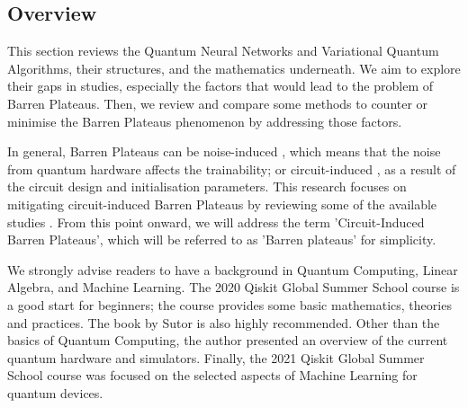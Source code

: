 \subsection{Overview}
This section reviews the Quantum Neural Networks and Variational Quantum Algorithms, their structures, and the mathematics underneath. 
We aim to explore their gaps in studies, especially the factors that would lead to the problem of Barren Plateaus.
Then, we review and compare some methods to counter or minimise the Barren Plateaus phenomenon by addressing those factors.

In general, Barren Plateaus can be noise-induced \cite{wangNoiseinducedBarrenPlateaus2021}, which means that the noise from quantum hardware affects the trainability; 
or circuit-induced \cite{mccleanBarrenPlateausQuantum2018}, as a result of the circuit design and initialisation parameters.
This research focuses on mitigating circuit-induced Barren Plateaus by reviewing some of the available studies \cite{pesahAbsenceBarrenPlateaus2021, cerezoCostFunctionDependent2021, skolikLayerwiseLearningQuantum2021}.
From this point onward, we will address the term 'Circuit-Induced Barren Plateaus', which will be referred to as 'Barren plateaus' for simplicity.

We strongly advise readers to have a background in Quantum Computing, Linear Algebra, and Machine Learning. 
The 2020 Qiskit Global Summer School course \cite{2020QiskitGlobal} is a good start for beginners; the course provides some basic mathematics, theories and practices. 
The book by Sutor \cite{sutorDancingQubitsHow2019} is also highly recommended. 
Other than the basics of Quantum Computing, the author presented an overview of the current quantum hardware and simulators.
Finally, the 2021 Qiskit Global Summer School course \cite{2021QiskitGlobal} was focused on the selected aspects of Machine Learning for quantum devices.